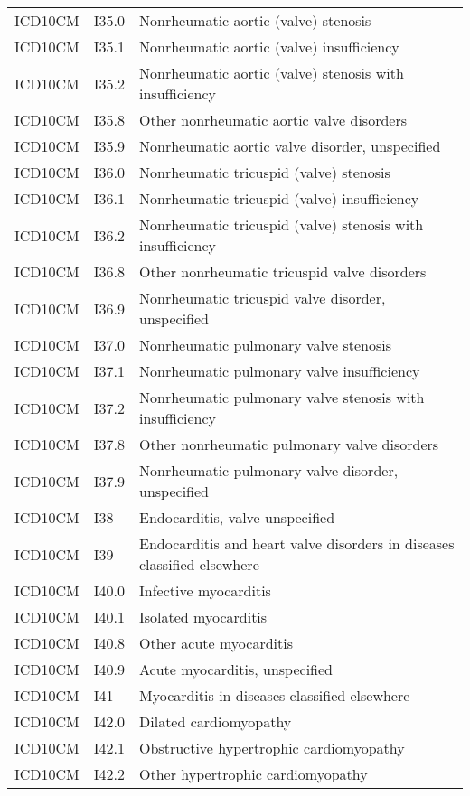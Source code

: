 \begin{longtable}{p{}p{}p{}}
  ICD10CM & I35.0 & Nonrheumatic aortic (valve) stenosis \\ 
  ICD10CM & I35.1 & Nonrheumatic aortic (valve) insufficiency \\ 
  ICD10CM & I35.2 & Nonrheumatic aortic (valve) stenosis with insufficiency \\ 
  ICD10CM & I35.8 & Other nonrheumatic aortic valve disorders \\ 
  ICD10CM & I35.9 & Nonrheumatic aortic valve disorder, unspecified \\ 
  ICD10CM & I36.0 & Nonrheumatic tricuspid (valve) stenosis \\ 
  ICD10CM & I36.1 & Nonrheumatic tricuspid (valve) insufficiency \\ 
  ICD10CM & I36.2 & Nonrheumatic tricuspid (valve) stenosis with insufficiency \\ 
  ICD10CM & I36.8 & Other nonrheumatic tricuspid valve disorders \\ 
  ICD10CM & I36.9 & Nonrheumatic tricuspid valve disorder, unspecified \\ 
  ICD10CM & I37.0 & Nonrheumatic pulmonary valve stenosis \\ 
  ICD10CM & I37.1 & Nonrheumatic pulmonary valve insufficiency \\ 
  ICD10CM & I37.2 & Nonrheumatic pulmonary valve stenosis with insufficiency \\ 
  ICD10CM & I37.8 & Other nonrheumatic pulmonary valve disorders \\ 
  ICD10CM & I37.9 & Nonrheumatic pulmonary valve disorder, unspecified \\ 
  ICD10CM & I38 & Endocarditis, valve unspecified \\ 
  ICD10CM & I39 & Endocarditis and heart valve disorders in diseases classified elsewhere \\ 
  ICD10CM & I40.0 & Infective myocarditis \\ 
  ICD10CM & I40.1 & Isolated myocarditis \\ 
  ICD10CM & I40.8 & Other acute myocarditis \\ 
  ICD10CM & I40.9 & Acute myocarditis, unspecified \\ 
  ICD10CM & I41 & Myocarditis in diseases classified elsewhere \\ 
  ICD10CM & I42.0 & Dilated cardiomyopathy \\ 
  ICD10CM & I42.1 & Obstructive hypertrophic cardiomyopathy \\ 
  ICD10CM & I42.2 & Other hypertrophic cardiomyopathy \\ 

\end{longtable}
